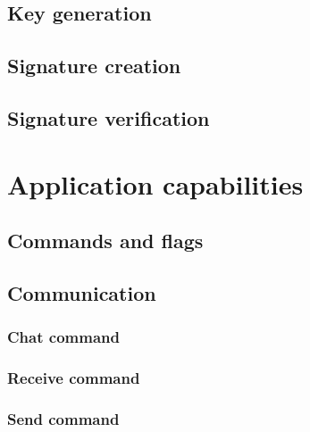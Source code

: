 \section{Key generation}
\label{sec:dil_keygen}


\section{Signature creation}
\label{sec:dil_sign}


\section{Signature verification}
\label{sec:dil_verify}


\chapter{Application capabilities}
\label{ch:app_capab}


\section{Commands and flags}
\label{sec:options}


\section{Communication}
\label{sec:cmd_app}


\subsection{Chat command}
\label{subsec:cmd_app_chat}


\subsection{Receive command}
\label{sec:cmd_app_recv}


\subsection{Send command}
\label{sec:cmd_app_send}


